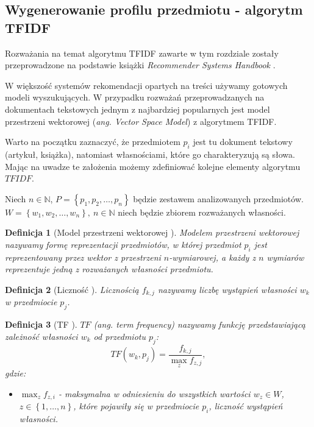 \documentclass[12pt,a4paper]{report}
\newtheorem{df}{Definicja}[chapter]
\newcommand{\set}[1]{\left\lbrace {#1} \right\rbrace}
\newcommand{\setN}{\mathbb{N}}
\newcommand{\setPrzedmioty}{\mathit{P}}
\newcommand{\setWlasnosci}{\mathit{W}}
\begin{document}
\subsection{Wygenerowanie profilu przedmiotu - algorytm TFIDF}
Rozważania na temat algorytmu TFIDF zawarte w tym rozdziale zostały przeprowadzone na podstawie książki \textit{Recommender Systems Handbook} {\citep[Sec 3.3.1.1]{rsh}}.
\bigskip
\bigskip

W większość systemów rekomendacji opartych na treści używamy gotowych modeli wyszukujących. W przypadku rozważań przeprowadzanych na dokumentach tekstowych jednym z najbardziej popularnych jest model przestrzeni wektorowej (\textit{ang. Vector Space Model}) z algorytmem TFIDF. 

Warto na początku zaznaczyć, że przedmiotem $p_i$ jest tu dokument tekstowy (artykuł, książka), natomiast własnościami, które go charakteryzują są słowa. Mając na uwadze te założenia możemy zdefiniować kolejne elementy algorytmu $TFIDF$.
\bigskip

Niech $n\in \setN$, $\setPrzedmioty = \set{p_1, p_2, \ldots ,p_n}$ będzie zestawem analizowanych przedmiotów. $W = \set{w_1, w_2, \ldots ,w_n}, \: n\in \setN $ niech będzie zbiorem rozważanych własności.

\begin{df}[Model przestrzeni wektorowej {\citep[Sec 3.3.1.1]{rsh}}]
Modelem przestrzeni wektorowej nazywamy formę reprezentacji przedmiotów, w której przedmiot $p_i$ jest reprezentowany przez wektor z przestrzeni $n$-wymiarowej, a każdy z $n$ wymiarów reprezentuje jedną z rozważanych własności przedmiotu. 
\end{df}

\begin{df}[Liczność {\citep[Sec 3.3.1.1]{rsh}}]
Licznością $f_{k,j}$ nazywamy liczbę wystąpień własności $w_k$ w przedmiocie $p_j$.
\end{df}

\begin{df}[TF {\citep[Sec 3.3.1.1]{rsh}}]
$TF$ (ang. \textit{term frequency}) nazywamy funkcję przedstawiającą zależność własności $w_k$ od przedmiotu $p_j$:
$$
TF(w_k, p_j)=\frac{f_{k,j}}{\max_{z}f_{z,j}},
$$
gdzie:
\begin{itemize}
\item $\max_{z}f_{z,i}$ - maksymalna w odniesieniu do wszystkich wartości $w_z \in \setWlasnosci$, $z \in \set{1, \ldots, n}$, które pojawiły się w przedmiocie $p_i$, liczność wystąpień własności. 
\end{itemize}
\end{df}
\end{document}
